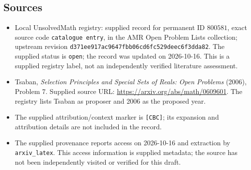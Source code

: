 \documentclass[11pt]{article}
\begin{document}
\subsection{Sources}
\begin{itemize}
\item Local UnsolvedMath registry: supplied record for permanent ID $800581$, exact source code \texttt{catalogue entry}, in the AMR Open Problem Lists collection; upstream revision \texttt{d371ee917ac9647fbb06cd6fc529deec6f3dda82}. The supplied status is \texttt{open}; the record was updated on 2026-10-16. This is a supplied registry label, not an independently verified literature assessment.
\item Tsaban, \emph{Selection Principles and Special Sets of Reals: Open Problems} (2006), Problem 7. Supplied source URL: \url{https://arxiv.org/abs/math/0609601}. The registry lists Tsaban as proposer and 2006 as the proposed year.
\item The supplied attribution/context marker is \texttt{[CBC]}; its expansion and attribution details are not included in the record.
\item The supplied provenance reports access on 2026-10-16 and extraction by \texttt{arxiv\_latex}. This access information is supplied metadata; the source has not been independently visited or verified for this draft.
\end{itemize}
\end{document}
